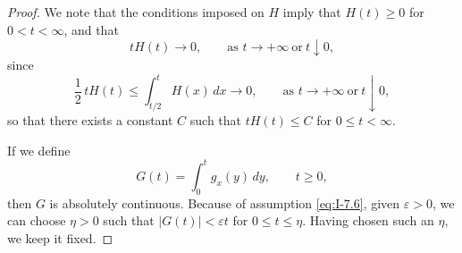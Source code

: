 \begin{proof}
We note that the conditions imposed on $H$ imply that $H(t)\ge 0$ for $0<t<\infty$, and that
\begin{equation}\label{eq:I-7.7}
tH(t)\to 0,\qquad\text{as }t\to+\infty\ \text{or}\ t\downarrow 0,
\end{equation}
since
\begin{equation*}
\frac12\,tH(t)\le\int_{t/2}^{t}H(x)\,dx\to 0,
\qquad\text{as }t\to+\infty\ \text{or}\ t\downarrow 0,
\end{equation*}
so that there exists a constant $C$ such that $tH(t)\le C$ for $0\le t<\infty$.

If we define
\begin{equation}\label{eq:I-7.8}
G(t)=\int_0^t g_x(y)\,dy,\qquad t\ge 0,
\end{equation}
then $G$ is absolutely continuous. Because of assumption \eqref{eq:I-7.6}, given $\varepsilon>0$, we can choose $\eta>0$ such that $|G(t)|<\varepsilon t$ for $0\le t\le\eta$. Having chosen such an $\eta$, we keep it fixed.


\end{proof}
